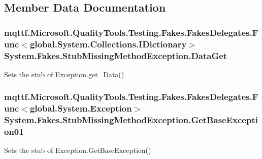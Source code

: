 \subsection{Member Data Documentation}
\hypertarget{class_system_1_1_fakes_1_1_stub_missing_method_exception_a915c9cd4f56907460b844eb06da56d53}{
\subsubsection[{Data\-Get}]{\setlength{\rightskip}{0pt plus 5cm}mqttf.\-Microsoft.\-Quality\-Tools.\-Testing.\-Fakes.\-Fakes\-Delegates.\-Func$<$global.\-System.\-Collections.\-I\-Dictionary$>$ System.\-Fakes.\-Stub\-Missing\-Method\-Exception.\-Data\-Get}}\label{class_system_1_1_fakes_1_1_stub_missing_method_exception_a915c9cd4f56907460b844eb06da56d53}


Sets the stub of Exception.\-get\-\_\-\-Data()

\hypertarget{class_system_1_1_fakes_1_1_stub_missing_method_exception_a17ecdba308a6f282e2a46c7461d4dd74}{
\subsubsection[{Get\-Base\-Exception01}]{\setlength{\rightskip}{0pt plus 5cm}mqttf.\-Microsoft.\-Quality\-Tools.\-Testing.\-Fakes.\-Fakes\-Delegates.\-Func$<$global.\-System.\-Exception$>$ System.\-Fakes.\-Stub\-Missing\-Method\-Exception.\-Get\-Base\-Exception01}}\label{class_system_1_1_fakes_1_1_stub_missing_method_exception_a17ecdba308a6f282e2a46c7461d4dd74}


Sets the stub of Exception.\-Get\-Base\-Exception()


